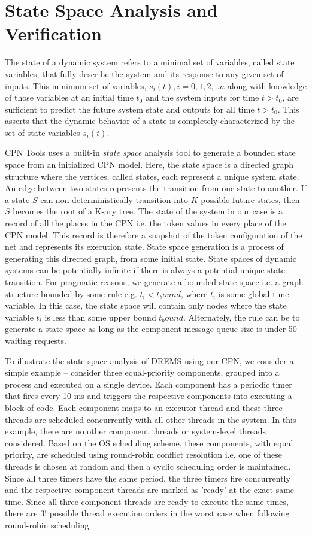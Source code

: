 \chapter{State Space Analysis and Verification}
\label{chapter:analysis}

The state of a dynamic system refers to a minimal set of variables, called state variables, that fully describe the system and its response to any given set of inputs. This minimum set of variables, $s_i(t), i=0,1,2,..n$ along with knowledge of those variables at an initial time $t_0$ and the system inputs for time $t > t_0$, are sufficient to predict the future system state and outputs for all time $t > t_0$. This asserts that the dynamic behavior of a state is completely characterized by the set of state variables $s_i(t)$. 

CPN Tools uses a built-in \emph{state space} analysis tool to generate a bounded state space from an initialized CPN model. Here, the state space is a directed graph structure where the vertices, called states, each represent a unique system state. An edge between two states represents the transition from one state to another. If a state $S$ can non-deterministically transition into $K$ possible future states, then $S$ becomes the root of a K-ary tree. The state of the system in our case is a record of all the places in the CPN i.e. the token values in every place of the CPN model. This record is therefore a snapshot of the token configuration of the net and represents its execution state. State space generation is a process of generating this directed graph, from some initial state. State spaces of dynamic systems can be potentially infinite if there is always a potential unique state transition. For pragmatic reasons, we generate a bounded state space i.e. a graph structure bounded by some rule e.g. $t_i < t_bound$, where $t_i$ is some global time variable. In this case, the state space will contain only nodes where the state variable $t_i$ is less than some upper bound $t_bound$. Alternately, the rule can be to generate a state space as long as the component message queue size is under 50 waiting requests. 

To illustrate the state space analysis of DREMS using our CPN, we consider a simple example -- consider three equal-priority components, grouped into a process and executed on a single device. Each component has a periodic timer that fires every 10 ms and triggers the respective components into executing a block of code. Each component maps to an executor thread and these three threads are scheduled concurrently with all other threads in the system. In this example, there are no other component threads or system-level threads considered. Based on the OS scheduling scheme, these components, with equal priority, are scheduled using round-robin conflict resolution i.e. one of these threads is chosen at random and then a cyclic scheduling order is maintained. Since all three timers have the same period, the three timers fire concurrently and the respective component threads are marked as 'ready' at the exact same time. Since all three component threads are ready to execute the same times, there are $3!$ possible thread execution orders in the worst case when following round-robin scheduling. 

